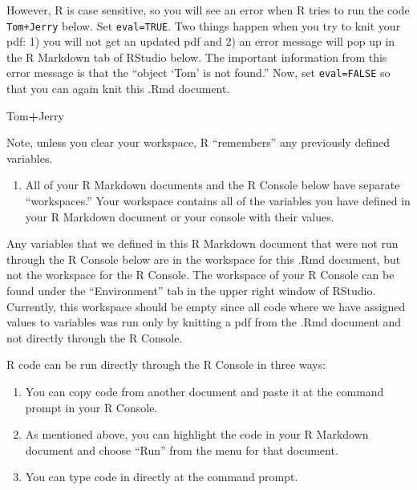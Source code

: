 \documentclass[]{article}
\newenvironment{Shaded}{\begin{snugshade}}{\end{snugshade}}
\newcommand{\NormalTok}[1]{#1}
\newcommand{\OperatorTok}[1]{\textcolor[rgb]{0.81,0.36,0.00}{\textbf{#1}}}
\providecommand{\tightlist}{%
  \setlength{\itemsep}{0pt}\setlength{\parskip}{0pt}}
\begin{document}
However, R is case sensitive, so you will see an error when R tries to
run the code \texttt{Tom+Jerry} below. Set \texttt{eval=TRUE}. Two
things happen when you try to knit your pdf: 1) you will not get an
updated pdf and 2) an error message will pop up in the R Markdown tab of
RStudio below. The important information from this error message is that
the ``object `Tom' is not found.'' Now, set \texttt{eval=FALSE} so that
you can again knit this .Rmd document.

\begin{Shaded}
\begin{Highlighting}[]
\NormalTok{Tom}\OperatorTok{+}\NormalTok{Jerry}
\end{Highlighting}
\end{Shaded}

Note, unless you clear your workspace, R ``remembers'' any previously
defined variables.

\begin{enumerate}
\def\labelenumi{\arabic{enumi}.}
\setcounter{enumi}{2}
\tightlist
\item
  All of your R Markdown documents and the R Console below have separate
  ``workspaces.'' Your workspace contains all of the variables you have
  defined in your R Markdown document or your console with their values.
\end{enumerate}

Any variables that we defined in this R Markdown document that were not
run through the R Console below are in the workspace for this .Rmd
document, but not the workspace for the R Console. The workspace of your
R Console can be found under the ``Environment'' tab in the upper right
window of RStudio. Currently, this workspace should be empty since all
code where we have assigned values to variables was run only by knitting
a pdf from the .Rmd document and not directly through the R Console.

R code can be run directly through the R Console in three ways:

\begin{enumerate}
\def\labelenumi{\arabic{enumi})}
\item
  You can copy code from another document and paste it at the command
  prompt in your R Console.
\item
  As mentioned above, you can highlight the code in your R Markdown
  document and choose ``Run'' from the menu for that document.
\item
  You can type code in directly at the command prompt.
\end{enumerate}
\end{document}
